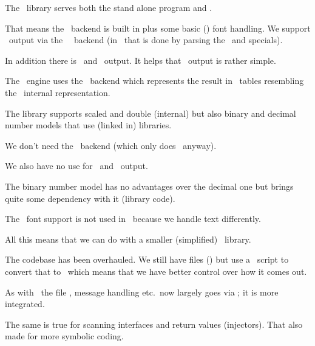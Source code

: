\startitem
    The \METAPOST\ library serves both the stand alone program and \LUATEX.
\stopitem

\startitem
    That means the \POSTSCRIPT\ backend is built in plus some basic (\TYPEONE)
    font handling. We support \PDF\ output via the \METAPOST\ \LUA\ backend (in
    \MKII\ that is done by parsing the \POSTSCRIPT\ and specials).
\stopitem

\startitem
    In addition there is \PNG\ and \SVG\ output. It helps that \METAPOST\ output is
    rather simple.
\stopitem

\startitem
    The \LUATEX\ engine uses the \LUA\ backend which represents the result in \LUA\ tables
    resembling the \METAPOST\ internal representation.
\stopitem

\startitem
    The library supports scaled and double (internal) but also binary and decimal
    number models that use (linked in) libraries.
\stopitem

%

\stopitemize

\stoptitle

\starttitle[title=The (\LUAMETATEX) library]

\startitemize

\startitem
    We don't need the \POSTSCRIPT\ backend (which only does \TYPEONE\ anyway).
\stopitem

\startitem
    We also have no use for \SVG\ and \PNG\ output.
\stopitem

\startitem
    The binary number model has no advantages over the decimal one but brings
    quite some dependency with it (library code).
\stopitem

\startitem
    The \TYPEONE\ font support is not used in \CONTEXT\ because we handle text
    differently.
\stopitem

\startitem
    All this means that we can do with a smaller (simplified) \METAPOST\ library.
\stopitem

\startitem
    The codebase has been overhauled. We still have  files (\CWEB) but
    use a \LUA\ script to convert that to \CCODE\ which means that we have better
    control over how it comes out.
\stopitem

\startitem
    As with \LUATEX\ the file \IO, message handling etc.\ now largely goes via \LUA;
    it is more integrated.
\stopitem

\startitem
    The same is true for scanning interfaces and return values (injectors). That also
    made for more symbolic coding.
\stopitem

